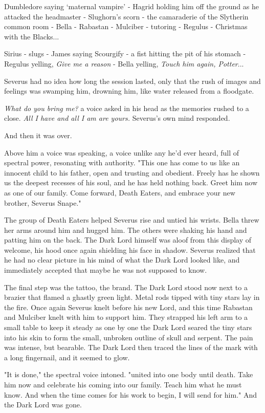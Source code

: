 \documentclass[a4paper,11pt]{article}
\begin{document}
Dumbledore saying `maternal vampire' - Hagrid holding him off the ground as he attacked the headmaster - Slughorn's scorn - the camaraderie of the Slytherin common room - Bella - Rabastan - Mulciber - tutoring - Regulus - Christmas with the Blacks...

Sirius - slugs - James saying Scourgify - a fist hitting the pit of his stomach - Regulus yelling, \emph{Give me a reason} - Bella yelling, \emph{Touch him again, Potter}...

Severus had no idea how long the session lasted, only that the rush of images and feelings was swamping him, drowning him, like water released from a floodgate.

\emph{What do you bring me?} a voice asked in his head as the memories rushed to a close. \emph{All I have and all I am are yours.} Severus's own mind responded.

And then it was over.

Above him a voice was speaking, a voice unlike any he'd ever heard, full of spectral power, resonating with authority. "This one has come to us like an innocent child to his father, open and trusting and obedient. Freely has he shown us the deepest recesses of his soul, and he has held nothing back. Greet him now as one of our family. Come forward, Death Eaters, and embrace your new brother, Severus Snape."

The group of Death Eaters helped Severus rise and untied his wrists. Bella threw her arms around him and hugged him. The others were shaking his hand and patting him on the back. The Dark Lord himself was aloof from this display of welcome, his hood once again shielding his face in shadow. Severus realized that he had no clear picture in his mind of what the Dark Lord looked like, and immediately accepted that maybe he was not supposed to know.

The final step was the tattoo, the brand. The Dark Lord stood now next to a brazier that flamed a ghastly green light. Metal rods tipped with tiny stars lay in the fire. Once again Severus knelt before his new Lord, and this time Rabastan and Mulciber knelt with him to support him. They strapped his left arm to a small table to keep it steady as one by one the Dark Lord seared the tiny stars into his skin to form the small, unbroken outline of skull and serpent. The pain was intense, but bearable. The Dark Lord then traced the lines of the mark with a long fingernail, and it seemed to glow.

"It is done," the spectral voice intoned. "united into one body until death. Take him now and celebrate his coming into our family. Teach him what he must know. And when the time comes for his work to begin, I will send for him." And the Dark Lord was gone.
\end{document}

